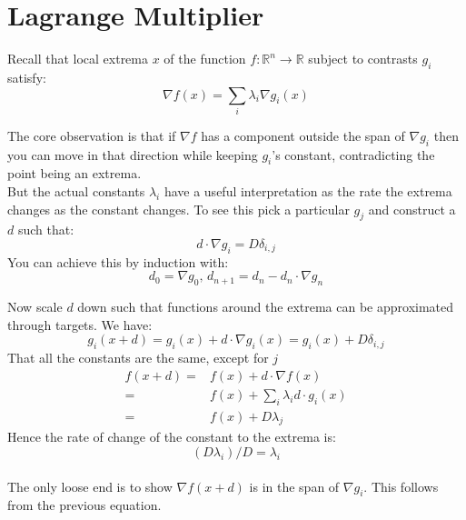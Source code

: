 
\section{Lagrange Multiplier}
Recall that local extrema $x$ of the function $f :\mathbb{R}^n \rightarrow \mathbb{R}$ subject to contrasts $g_i$ satisfy:
\[\nabla f(x) = \sum_i \lambda_i \nabla g_i(x)\]

The core observation is that if $\nabla f$ has a component outside the span of ${\nabla g_i}$ then you can move in that direction while keeping $g_i$'s constant, contradicting the point being an extrema.
\\

But the actual constants $\lambda_i$ have a useful interpretation as the rate the extrema changes as the constant changes.
To see this pick a particular $g_j$ and construct a $d$ such that:
\[d\cdot \nabla g_i = D\delta_{i,j}\]
You can achieve this by induction with:
\[d_0 = \nabla g_0,\, d_{n+1} = d_n -d_n\cdot\nabla g_n\]

Now scale $d$ down such that functions around the extrema can be approximated through targets.
We have:
\[g_i(x+d) = g_i(x)+d\cdot\nabla g_i(x) = g_i(x) + D\delta_{i,j}\]
That all the constants are the same, except for $j$
\\

\begin{equation*}
	\begin{aligned}
		f(x+d) =& f(x)+d\cdot\nabla f(x) \\
		=& f(x) + \sum_i \lambda_i d \cdot g_i(x) \\ 
		=& f(x) + D\lambda_j
	\end{aligned}
\end{equation*}
Hence the rate of change of the constant to the extrema is:
\[(D\lambda_i)/D = \lambda_i\]
\\

The only loose end is to show $\nabla f(x+d)$ is in the span of ${\nabla g_i }$.
This follows from the previous equation.

